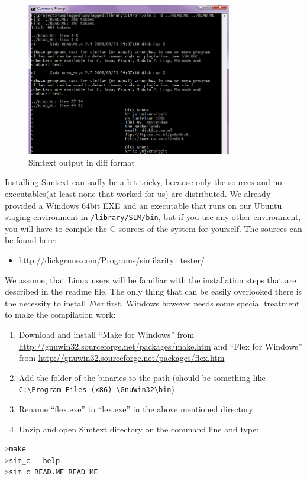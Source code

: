 \begin{figure}[htbp]
  \centering
    \includegraphics[width=0.8\textwidth]{images/simtext-output-diff.png}
  \caption{Simtext output in diff format}
  \label{fig:simtextDiff}
\end{figure}

Installing Simtext can sadly be a bit tricky, because only the sources and no executables(at least none that worked for us) 
are distributed. We already
provided a Windows 64bit EXE and an executable that runs on our Ubuntu staging environment in \texttt{/library/SIM/bin}, 
but if you use any other environment, you will have to compile the C sources of the system for yourself. The sources can
be found here:

\begin{itemize}
\item \url{http://dickgrune.com/Programs/similarity_tester/}
\end{itemize} 

We assume, that Linux users will be familiar with the installation steps that are described in the readme file. The only
thing that can be easily overlooked there is the necessity to install \textit{Flex} first. Windows
however needs some special treatment to make the compilation work:

\begin{enumerate}
\item Download and install \enquote{Make for Windows} from \url{http://gnuwin32.sourceforge.net/packages/make.htm} and 
\enquote{Flex for Windows} from \url{http://gnuwin32.sourceforge.net/packages/flex.htm}
\item Add the folder of the binaries to the path (should be something like 
\texttt{C:\textbackslash Program Files (x86) \textbackslash GnuWin32\textbackslash bin})
\item Rename \enquote{flex.exe} to \enquote{lex.exe} in the above mentioned directory
\item Unzip and open Simtext directory on the command line and type:
\end{enumerate}
\begin{lstlisting}[caption=Installing and checking simtext, language=bash]
>make
>sim_c --help
>sim_c READ.ME READ_ME
\end{lstlisting}

